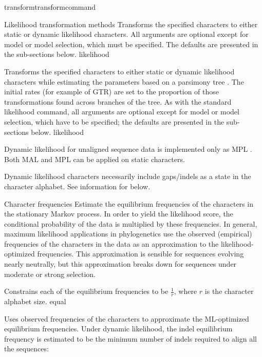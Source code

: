 \begin{command}{transform}{transformcommand}
\begin{arguments}
\begin{argumentgroup}{Likelihood transformation methods}
{Transforms the specified characters to either static or dynamic
likelihood characters. All arguments are optional except for model or model selection, 
which must be specified. The defaults are presented in the sub-sections below.}
{likelihood}

{Transforms the specified characters to either static or dynamic
likelihood characters while estimating the parameters based on a
parsimony tree \cite{wheeler2013}. The initial rates (for example of 
GTR) are set to the proportion of those transformations found
across branches of the tree. As with the standard likelihood command,
all arguments are optional except for model or model selection, which 
have to be specified; the defaults are presented in the sub-sections below.}
{likelihood}

\begin{statement}
Dynamic likelihood for unaligned sequence data is
implemented only as MPL \cite{barryandhartigan1987}. Both MAL and
MPL can be applied on static characters.
\end{statement}

\begin{statement}
Dynamic likelihood characters necessarily include gaps/indels as
a state in the character alphabet. See information for
 below.
\end{statement}

\end{argumentgroup}

\begin{argumentgroup} {Character frequencies} %
Estimate the equilibrium frequencies of the characters in the stationary
Markov process. In order to yield the likelihood score, the 
conditional probability of the data is multiplied by these frequencies. 
In general, maximum likelihood applications in phylogenetics use the observed (empirical)
frequencies of the characters in the data as an
approximation to the likelihood-optimized frequencies. This
approximation is sensible for sequences evolving nearly
neutrally, but this approximation breaks down for sequences
under moderate or strong selection.

{Constrains each of the equilibrium frequencies to be
$\frac{1}{r}$, where $r$ is the character alphabet size.}
{equal}

{Uses observed frequencies of the characters to
approximate the ML-optimized equilibrium
frequencies. Under dynamic likelihood, the indel
equilibrium frequency is estimated to be the minimum
number of indels required to align all the
sequences: 

}
\end{argumentgroup}
\end{arguments}
\end{command}
